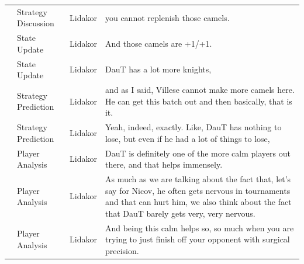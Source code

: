 {\begin{longtable}{@{}>{\theAppRow}r|L{2.3cm}L{1.0cm}U{11.55cm}@{}}
    & Strategy Discussion   & Lidakor & you cannot replenish those camels.                                                                                                                                                                                                                                                              \\
    & State Update          & Lidakor & And those camels are +1/+1.                                                                                                                                                                                                                                                                     \\
    & State Update          & Lidakor & DauT has a lot more knights,                                                                                                                                                                                                                                                                    \\
    & Strategy Prediction   & Lidakor & and as I said, Villese cannot make more camels here. He can get this batch out and then basically, that is it.                                                                                                                                                                                  \\
    & Strategy Prediction   & Lidakor & Yeah, indeed, exactly. Like, DauT has nothing to lose, but even if he had a lot of things to lose,                                                                                                                                                                                              \\
    & Player Analysis       & Lidakor & DauT is definitely one of the more calm players out there, and that helps immensely.                                                                                                                                                                                                            \\
    & Player Analysis       & Lidakor & As much as we are talking about the fact that, let's say for Nicov, he often gets nervous in tournaments and that can hurt him, we also think about the fact that DauT barely gets very, very nervous.                                                                                          \\
    & Player Analysis       & Lidakor & And being this calm helps so, so much when you are trying to just finish off your opponent with surgical precision.                                                                                                                                                                             \\

\end{longtable}}
